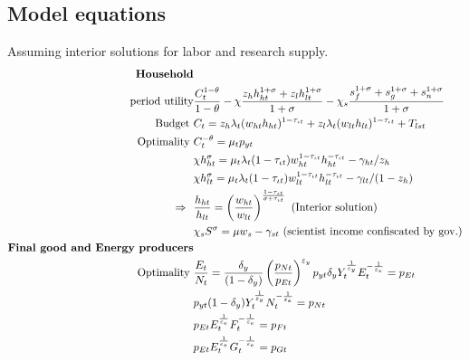 \subsection{Model equations}
Assuming interior solutions for labor and research supply.
\begin{align*}
\text{\textbf{Household}}&\\ \text{period utility}\vspace{4mm}&  \frac{C_t^{1-\theta}}{1-\theta}-\chi\frac{z_hh_{ht}^{1+\sigma}+z_lh_{lt}^{1+\sigma}}{1+\sigma}-\chi_s\frac{s_f^{1+\sigma}+s_g^{1+\sigma}+s_n^{1+\sigma}}{{1+\sigma}} %
\\
\text{Budget}\ \vspace{4mm}& C_t=z_h \lambda_t (w_{ht}h_{ht})^{1-\tau_{\iota t}}+z_l \lambda_t (w_{lt}h_{lt})^{1-\tau_{\iota t}}+T_{lst}\\
\text{Optimality}\ \vspace{4mm}
& C_t^{-\theta}= \mu_tp_{yt}\\
& \chi h_{ht}^{\sigma}=\mu_t \lambda_t(1-\tau_{\iota t})w_{ht}^{1-\tau_{\iota t}}h_{ht}^{-\tau_{\iota t}}-\gamma_{ht}/z_h\\
& \chi h_{lt}^{\sigma}=\mu_t \lambda_t(1-\tau_{\iota t})w_{lt}^{1-\tau_{\iota t}}h_{lt}^{-\tau_{\iota t}}-\gamma_{lt}/(1-z_h)\\
\Rightarrow\ \ & \frac{h_{ht}}{h_{lt}}=\left(\frac{w_{ht}}{w_{lt}}\right)^{\frac{1-\tau_{\iota t}}{{\sigma+\tau_{\iota t}}}}\ \text{(Interior solution)}
\\
& \chi_s S^\sigma =\mu w_s-\gamma_{st}\ \text{(scientist income confiscated by gov.)}\\
\text{\textbf{Final good and Energy producers}}&\\
\text{Optimality}\ \vspace{4mm}&
\frac{E_t}{N_t}=\frac{\delta_y}{(1-\delta_y)}\left(\frac{p_{Nt}}{p_{Et}}\right)^{\varepsilon_y} p_{yt}\delta_yY_t^\frac{1}{\varepsilon_y}E_t^{-\frac{1}{\varepsilon_e}}=p_{Et}\\
& p_{yt}(1-\delta_y)Y_t^\frac{1}{\varepsilon_y}N_t^{-\frac{1}{\varepsilon_e}}=p_{Nt}\\
&
p_{Et}E_t^\frac{1}{\varepsilon_e}{F}_t^{-\frac{1}{\varepsilon_e}}=p_{{F}t}\\
& p_{Et}E_t^\frac{1}{\varepsilon_e}G_t^{-\frac{1}{\varepsilon_e}}=p_{Gt}\\

\end{align*}
